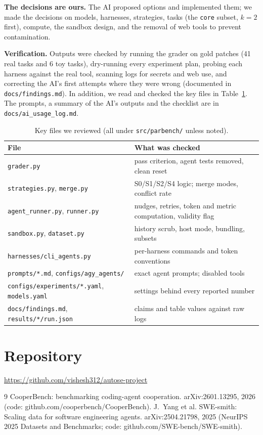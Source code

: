 \documentclass[sigconf,nonacm]{acmart}
\begin{document}
\textbf{The decisions are ours.} The AI proposed options and implemented them; we made the decisions on models, harnesses, strategies, tasks (the \texttt{core} subset, $k{=}2$ first), compute, the sandbox design, and the removal of web tools to prevent contamination.

\textbf{Verification.} Outputs were checked by running the grader on gold patches (41 real tasks and 6 toy tasks), dry-running every experiment plan, probing each harness against the real tool, scanning logs for secrets and web use, and correcting the AI's first attempts where they were wrong (documented in \texttt{docs/findings.md}). In addition, we read and checked the key files in Table~\ref{tab:files}. The prompts, a summary of the AI's outputs and the checklist are in \texttt{docs/ai\_usage\_log.md}.

\begin{table}[t]
\caption{Key files we reviewed (all under \texttt{src/parbench/} unless noted).}
\label{tab:files}
\footnotesize
\renewcommand{\arraystretch}{1.15}
\begin{tabular}{@{}p{}p{}@{}}
\toprule
File & What was checked \\
\midrule
\texttt{grader.py} & pass criterion, agent tests removed, clean reset \\
\texttt{strategies.py}, \texttt{merge.py} & S0/S1/S2/S4 logic; merge modes, conflict rate \\
\texttt{agent\_runner.py}, \texttt{runner.py} & nudges, retries, token and metric computation, validity flag \\
\texttt{sandbox.py}, \texttt{dataset.py} & history scrub, host mode, bundling, subsets \\
\texttt{harnesses/cli\_agents.py} & per-harness commands and token conventions \\
\texttt{prompts/*.md}, \texttt{configs/agy\_agents/} & exact agent prompts; disabled tools \\
\texttt{configs/experiments/*.yaml}, \texttt{models.yaml} & settings behind every reported number \\
\texttt{docs/findings.md}, \texttt{results/*/run.json} & claims and table values against raw logs \\
\bottomrule
\end{tabular}
\end{table}

\section*{Repository}
\url{https://github.com/vishesh312/autose-project}

\begin{thebibliography}{9}
 CooperBench: benchmarking coding-agent cooperation. arXiv:2601.13295, 2026 (code: github.com/cooperbench/CooperBench).
 J.~Yang et al. SWE-smith: Scaling data for software engineering agents. arXiv:2504.21798, 2025 (NeurIPS 2025 Datasets and Benchmarks; code: github.com/SWE-bench/SWE-smith).
\end{thebibliography}
\end{document}

